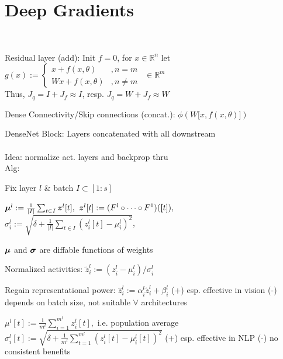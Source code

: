 \section{Deep Gradients}
\\ 
\begin{inparaitem}[$\color{mygreen} \triangleright$]
\item Residual layer (add): Init $f=0$, for $x\in\mathbb{R}^n$ let $g(x):=
\begin{cases}
    x+f(x,\theta) &, n=m\\
    Wx+f(x,\theta)&, n\neq m
\end{cases}
\ \ \in\mathbb{R}^m$\\
Thus, $J_q=I+J_f\approx I$, resp. $J_q=W+J_f\approx W$\\
\item Dense Connectivity/Skip connections (concat.): $\phi(W\lbrack x,f(x,\theta)\rbrack)$
\item DenseNet Block: Layers concatenated with all downstream\\
\\
Idea: normalize act. layers and backprop thru\\
Alg: \item Fix layer $l$ \& batch $I\subset [1:s]$
\item $\boldsymbol{\mu}^l:=\frac{1}{|I|}\sum_{t\in I}\boldsymbol{z}^l[t],$ $\boldsymbol{z}^l[t]:=(F^l\circ\cdots\circ F^1)(\boldsymbol[t]),$ $\sigma_i^l:=\sqrt{\delta + \frac{1}{|I|}\sum_{t\in I}(z^l_i[t]-\mu_i^l)^2}$,
\item $\boldsymbol{\mu}$ and $\boldsymbol{\sigma}$ are diffable functions of weights

\item Normalized activities: $\tilde{z}_i^l:=(z_i^l-\mu_i^l)/\sigma_i^l$

\item Regain representational power: $\hat{z}_i^l:=\alpha_i^l\tilde{z}_i^l+\beta_i^l$
(+) esp. effective in vision
(-) depends on batch size, not suitable $\forall$ architectures


\item $\mu^l[t]:=\frac{1}{m^l}\sum^{m^l}_{i=1}z_i^l[t],$ i.e. population average $\sigma_i^l[t]:=\sqrt{\delta + \frac{1}{m^l}\sum^{m^l}_{t=1}(z^l_i[t]-\mu_i^l[t])^2}$
(+) esp. effective in NLP (-) no consistent benefits
\end{inparaitem}